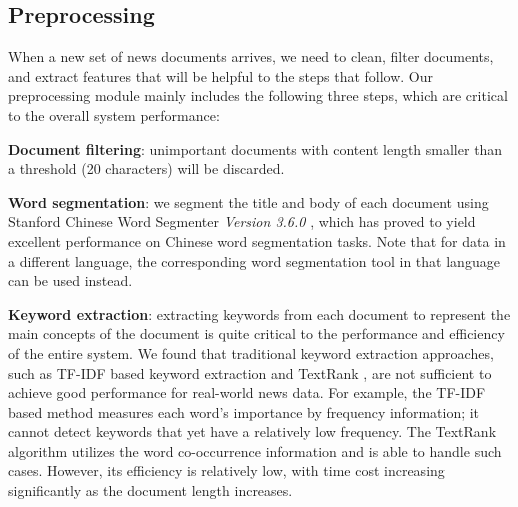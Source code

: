 \subsection{Preprocessing}
\label{subsec:preprocessing}
When a new set of news documents arrives,  we need to clean, filter documents, and extract features that will be helpful to the steps that follow. 
Our preprocessing module mainly includes the following three steps, which are critical to the overall system performance:

\textbf{Document filtering}: unimportant documents with content length smaller than a threshold (20 characters) will be discarded.

\textbf{Word segmentation}: we segment the title and body of each document using Stanford Chinese Word Segmenter \textit{Version 3.6.0} \cite{chang2008optimizing}, which has proved to yield excellent performance on Chinese word segmentation tasks. Note that for data in a different language, the corresponding word segmentation tool in that language can be used instead. 


\textbf{Keyword extraction}: extracting keywords from each document to represent the main concepts of the document is quite critical to the performance and efficiency of the entire system. We found that traditional keyword extraction approaches, such as TF-IDF based keyword extraction and TextRank \cite{mihalcea2004textrank}, are not sufficient to achieve good performance for real-world news data. For example, the TF-IDF based method measures each word's importance by frequency information; it cannot detect keywords that yet have a relatively low frequency. The TextRank algorithm utilizes the word co-occurrence information and is able to handle such cases. However, its efficiency is relatively low, with time cost increasing significantly as the document length increases.


